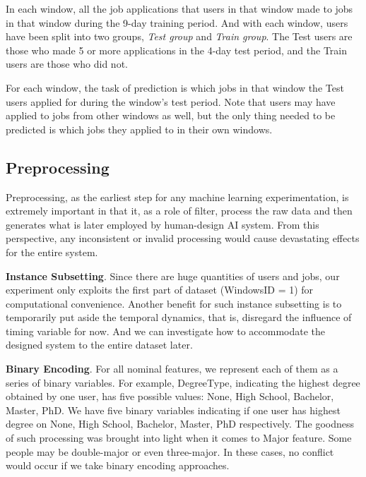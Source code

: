 \documentclass{article} %
\begin{document}
In each window, all the job applications that users in that window made to
jobs in that window during the 9-day training period. 
And with each window, users have been split into two groups, {\it Test group}
and {\it Train group}. The Test users are those who made 5 or more
applications in the 4-day test period, and the Train users are those who did
not.

For each window, the task of prediction is which jobs in that window the Test
users applied for during the window's test period. Note that users may have
applied to jobs from other windows as well, but the only thing needed to be
predicted is which jobs they applied to in their own windows.


\subsection{Preprocessing} %
Preprocessing, as the earliest step for any machine learning
experimentation, is extremely important in that it, as a role of filter, 
process the raw data and then generates what is later employed by human-design
AI system. From this perspective, any inconsistent or invalid processing would
cause devastating effects for the entire system.

{\bf Instance Subsetting}.
Since there are huge quantities of users and jobs, our experiment only
exploits the first part of dataset (WindowsID = 1) for computational
convenience. Another benefit for such instance subsetting is to temporarily
put aside the temporal dynamics, that is, disregard the influence of timing
variable for now. And we can investigate how to accommodate the designed system
to the entire dataset later.

{\bf Binary Encoding}.
For all nominal features, we represent each of them as a series of binary
variables. For example, DegreeType, indicating the highest
degree obtained by one user, has five possible values: None, High
School, Bachelor, Master, PhD. We have five binary variables indicating if one
user has highest degree on None, High School, Bachelor, Master, PhD
respectively. 
The goodness of such processing was brought into light when it comes to
Major feature. Some people may be double-major or even three-major. 
In these cases, no conflict would occur if we take binary encoding approaches.
\end{document}
